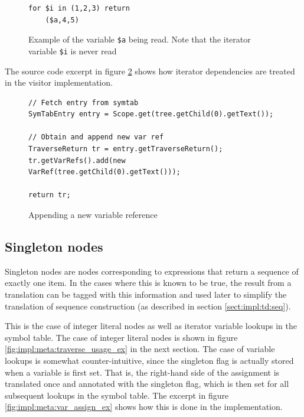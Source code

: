 \begin{figure}[!htp]
\begin{center}
\begin{minipage}[h]{5cm}
\begin{verbatim}
for $i in (1,2,3) return 
    ($a,4,5)
\end{verbatim}
\end{minipage}
  \caption{Example of the variable \texttt{\$a} being read. Note that the iterator
  variable \texttt{\$i} is never read}
  \label{fig:impl:meta:var_ref_ex}
\end{center}
\end{figure}

The source code excerpt in figure \ref{fig:impl:meta:var_ref_impl2} shows how
iterator dependencies are treated in the visitor implementation.

\begin{figure}[!htp]
\begin{center}
\begin{Verbatim}
// Fetch entry from symtab
SymTabEntry entry = Scope.get(tree.getChild(0).getText());
            
// Obtain and append new var ref
TraverseReturn tr = entry.getTraverseReturn();
tr.getVarRefs().add(new VarRef(tree.getChild(0).getText()));

return tr;
\end{Verbatim}
  \caption{Appending a new variable reference}
  \label{fig:impl:meta:var_ref_impl2}
\end{center}
\end{figure}

\subsection{Singleton nodes}
Singleton nodes are nodes corresponding to expressions that return a sequence of exactly one item. In
the cases where this is known to be true, the result from a translation can be
tagged with this information and used later to simplify the translation of
sequence construction (as described in section \ref{sect:impl:td:seq}).

This is the case of integer literal nodes as well as iterator variable lookups in the
symbol table. The case of integer literal nodes is shown in figure
\ref{fig:impl:meta:traverse_usage_ex} in the next section. The case of variable
lookups is somewhat counter-intuitive, since the singleton flag is actually
stored when a variable is first set. That is, the right-hand side of the
assignment is translated once and annotated with the singleton flag, which is
then set for all subsequent lookups in the symbol table. The excerpt in figure 
\ref{fig:impl:meta:var_assign_ex} shows how this is done in the implementation.

